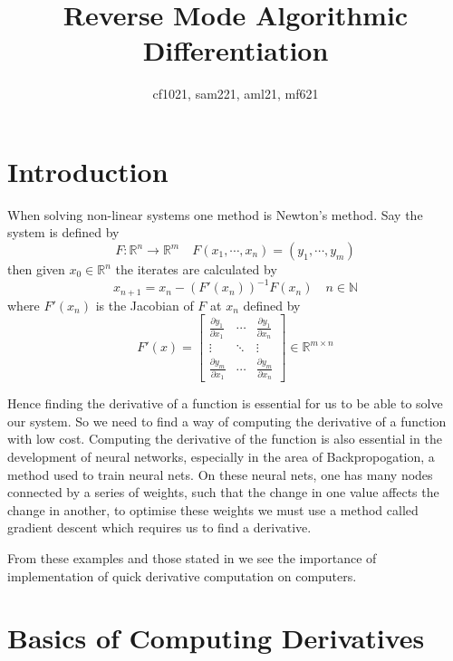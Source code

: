 \documentclass{article}
\title{Reverse Mode Algorithmic Differentiation}
\author{cf1021, sam221, aml21, mf621}
\date{}
\begin{document}
\maketitle

\section{Introduction}

When solving non-linear systems one method is Newton's method. Say the system is defined by
\begin{equation} \label{Fxy}
        F: \mathbb{R}^n \rightarrow \mathbb{R}^m \quad F(x_1, \cdots, x_n) = (y_1, \cdots, y_m)
\end{equation}
then given $x_0 \in \mathbb{R}^n$ the iterates are calculated by
\begin{equation*}
x_{n+1} = x_n - (F'(x_n))^{-1}F(x_n) \quad n \in \mathbb{N}
\end{equation*}
where $F'(x_n)$ is the Jacobian of $F$ at $x_n$ defined by
\begin{equation} \label{jacobian}
    F'(x) = \begin{bmatrix}
        \frac{\partial y_1}{\partial x_1} & \cdots & \frac{\partial y_1}{\partial x_n} \\
        \vdots & \ddots & \vdots \\
        \frac{\partial y_m}{\partial x_1} & \cdots & \frac{\partial y_m}{\partial x_n}
    \end{bmatrix} \in \mathbb{R}^{m \times n}
\end{equation}

Hence finding the derivative of a function is essential for us to be able to solve our system. So we need to find a way of computing the derivative of a function with low cost. Computing the derivative of the function is also essential in the development of neural networks, especially in the area of Backpropogation, a method used to train neural nets. On these neural nets, one has many nodes connected by a series of weights, such that the change in one value affects the change in another, to optimise these weights we must use a method called gradient descent which requires us to find a derivative.

From these examples and those stated in \cite{appad} we see the importance of implementation of quick derivative computation on computers.

\section{Basics of Computing Derivatives}
\end{document}
